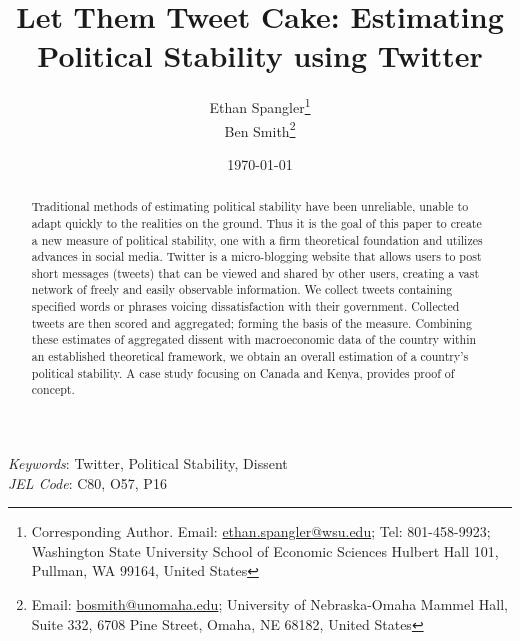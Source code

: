 \documentclass[12pt]{article}
\begin{document}
  


\begin{titlepage}




\title{Let Them Tweet Cake: Estimating Political Stability using Twitter}



\author{Ethan Spangler\thanks{Corresponding Author. Email: {\href{mailto:ethan.spangler@wsu.edu}{ethan.spangler@wsu.edu}}; Tel: 801-458-9923; Washington State University School of Economic Sciences Hulbert Hall 101, Pullman, WA 99164, United States}  \\
Ben Smith\thanks{Email: {\href{mailto:bosmith@unomaha.edu}{bosmith@unomaha.edu}}; University of Nebraska-Omaha Mammel Hall, Suite 332, 6708 Pine Street, Omaha, NE 68182, United States}}



\date{\today}

\maketitle

\begin{abstract}
\noindent Traditional methods of estimating political stability have been unreliable, unable to adapt quickly to the realities on the ground. Thus it is the goal of this paper to create a new measure of political stability, one with a firm theoretical foundation and utilizes advances in social media. Twitter is a micro-blogging website that allows users to post short messages (tweets) that can be viewed and shared by other users, creating a vast network of freely and easily observable information. We collect tweets containing specified words or phrases voicing dissatisfaction with their government. Collected tweets are then scored and aggregated; forming the basis of the measure. Combining these estimates of aggregated dissent with macroeconomic data of the country within an established theoretical framework, we obtain an overall estimation of a country's political stability. A case study focusing on Canada and Kenya, provides proof of concept.
\end{abstract}

\noindent \textit{Keywords}: Twitter, Political Stability, Dissent \\

\noindent \textit{JEL Code}: C80, O57, P16




\end{titlepage}
\end{document}
